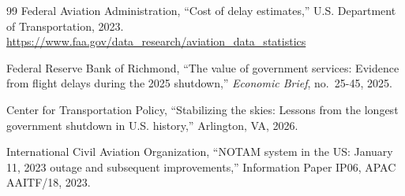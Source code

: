 \documentclass[11pt]{article}
\begin{document}
\begin{thebibliography}{99}
Federal Aviation Administration, ``Cost of delay estimates,'' U.S. Department of
Transportation, 2023.
\url{https://www.faa.gov/data_research/aviation_data_statistics}

Federal Reserve Bank of Richmond, ``The value of government services: Evidence
from flight delays during the 2025 shutdown,'' \emph{Economic Brief}, no.~25-45,
2025.

Center for Transportation Policy, ``Stabilizing the skies: Lessons from the
longest government shutdown in U.S. history,'' Arlington, VA, 2026.

International Civil Aviation Organization, ``NOTAM system in the US: January 11,
2023 outage and subsequent improvements,'' Information Paper IP06, APAC AAITF/18,
2023.

\end{thebibliography}
\end{document}
